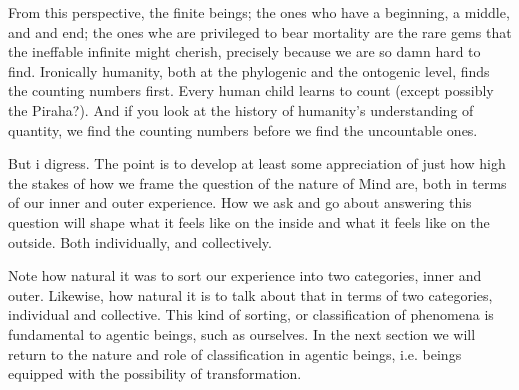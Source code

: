 From this perspective, the finite beings; the ones who have a beginning, a middle, and and end; the ones whe are privileged to bear mortality are the rare gems that the ineffable infinite might cherish, precisely because we are so damn hard to find. Ironically humanity, both at the phylogenic and the ontogenic level, finds the counting numbers first. Every human child learns to count (except possibly the Piraha?). And if you look at the history of humanity's understanding of quantity, we find the counting numbers before we find the uncountable ones.

But i digress. The point is to develop at least some appreciation of just how high the stakes of how we frame the question of the nature of Mind are, both in terms of our inner and outer experience. How we ask and go about answering this question will shape what it feels like on the inside and what it feels like on the outside. Both individually, and collectively. 

Note how natural it was to sort our experience into two categories, inner and outer. Likewise, how natural it is to talk about that in terms of two categories, individual and collective. This kind of sorting, or classification of phenomena is fundamental to agentic beings, such as ourselves. In the next section we will return to the nature and role of classification in agentic beings, i.e. beings equipped with the possibility of transformation.
